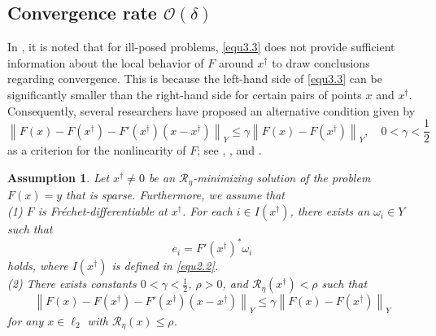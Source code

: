 \documentclass[a4paper,12pt]{article}
\newtheorem{assumption}[theorem]{Assumption}
\numberwithin{equation}{section}
\begin{document}
\subsection{Convergence rate $\mathcal{O}\left(\delta\right)$}\label{sec3.2}

\par In \cite[p.6]{KNS08}, it is noted that for ill-posed problems, \eqref{equ3.3} does not provide sufficient information about the local behavior of $F$ around $x^{\dagger}$ to draw conclusions regarding convergence. This is because the left-hand side of \eqref{equ3.3} can be significantly smaller than the right-hand side for certain pairs of points $x$ and $x^{\dagger}$. Consequently, several researchers have proposed an alternative condition given by
\begin{equation}\label{equ3.21}
    \left\|F\left(x\right)-F\left(x^{\dagger}\right)-F'\left(x^{\dagger}\right)\left(x- x^{\dagger}\right)\right\|_{Y}\leq \gamma\left\|F\left(x\right)- F\left(x^{\dagger}\right)\right\|_{Y},\quad 0<\gamma<\frac{1}{2}
\end{equation}
as a criterion for the nonlinearity of $F$; see \cite[pp.278-279]{EHN96}, \cite[p.6]{KNS08}, and \cite[PP.69-70]{SKHK12}.

\begin{assumption}\label{ass3.8}
    Let $x^{\dagger}\neq 0$ be an $\mathcal{R}_{\eta}$-minimizing solution of the problem $F\left(x\right)=y$ that is sparse. Furthermore, we assume that \\
    (1) $F$ is Fr\'{e}chet-differentiable at $x^{\dagger}$. For each $i\in I\left(x^{\dagger}\right)$, there exists an $\omega_{i}\in Y$ such that
    \begin{equation}\label{equ3.22}
        e_{i}=F'\left(x^{\dagger}\right)^{*}\omega_{i}
    \end{equation}
    holds, where $I\left(x^{\dagger}\right)$ is defined in \eqref{equ2.2}. \\
    (2) There exists constants $0<\gamma<\frac{1}{2}$, $\rho>0$, and $\mathcal{R}_{\eta}\left(x^{\dagger}\right)<\rho$ such that
    \begin{equation}\label{equ3.23}
        \left\|F\left(x\right)-F\left(x^{\dagger}\right)-F'\left(x^{\dagger}\right) \left(x-x^{\dagger}\right)\right\|_{Y} \leq \gamma\left\|F\left(x\right)-F\left(x^{\dagger}\right)\right\|_{Y}
    \end{equation}
    for any $x\in\ell_{2}$ with $\mathcal{R}_{\eta}\left(x\right)\leq\rho$.
\end{assumption}
\end{document}
